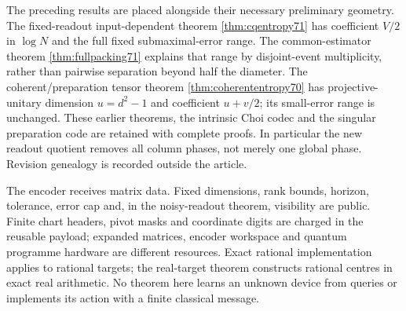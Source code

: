 The preceding results are placed alongside their necessary preliminary
geometry. The fixed-readout input-dependent theorem
\ref{thm:cqentropy71} has coefficient $V/2$ in $\log N$ and the full
fixed submaximal-error range. The common-estimator theorem
\ref{thm:fullpacking71} explains that range by disjoint-event
multiplicity, rather than pairwise separation beyond half the diameter.
The coherent/preparation tensor theorem
\ref{thm:coherententropy70} has projective-unitary dimension $u=d^2-1$
and coefficient $u+v/2$; its small-error range is unchanged.
These earlier theorems, the intrinsic Choi codec and the singular
preparation code are retained with complete proofs. In particular the
new readout quotient removes all column phases, not merely one global
phase. Revision genealogy is recorded outside the article.

The encoder receives matrix data. Fixed dimensions, rank bounds,
horizon, tolerance, error cap and, in the noisy-readout theorem,
visibility are public. Finite chart headers,
pivot masks and coordinate digits are charged in the reusable payload;
expanded matrices, encoder workspace and quantum programme hardware
are different resources. Exact rational implementation applies to
rational targets; the real-target theorem constructs rational centres
in exact real arithmetic. No theorem here learns an unknown device
from queries or implements its action with a finite classical message.

